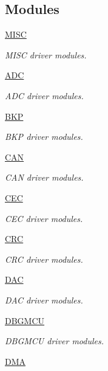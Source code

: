 \subsection*{Modules}
\begin{DoxyCompactItemize}
\item 
\hyperlink{group___m_i_s_c}{M\+I\+SC}
\begin{DoxyCompactList}\small\item\em M\+I\+SC driver modules. \end{DoxyCompactList}\item 
\hyperlink{group___a_d_c}{A\+DC}
\begin{DoxyCompactList}\small\item\em A\+DC driver modules. \end{DoxyCompactList}\item 
\hyperlink{group___b_k_p}{B\+KP}
\begin{DoxyCompactList}\small\item\em B\+KP driver modules. \end{DoxyCompactList}\item 
\hyperlink{group___c_a_n}{C\+AN}
\begin{DoxyCompactList}\small\item\em C\+AN driver modules. \end{DoxyCompactList}\item 
\hyperlink{group___c_e_c}{C\+EC}
\begin{DoxyCompactList}\small\item\em C\+EC driver modules. \end{DoxyCompactList}\item 
\hyperlink{group___c_r_c}{C\+RC}
\begin{DoxyCompactList}\small\item\em C\+RC driver modules. \end{DoxyCompactList}\item 
\hyperlink{group___d_a_c}{D\+AC}
\begin{DoxyCompactList}\small\item\em D\+AC driver modules. \end{DoxyCompactList}\item 
\hyperlink{group___d_b_g_m_c_u}{D\+B\+G\+M\+CU}
\begin{DoxyCompactList}\small\item\em D\+B\+G\+M\+CU driver modules. \end{DoxyCompactList}\item 
\hyperlink{group___d_m_a}{D\+MA}

\end{DoxyCompactItemize}
